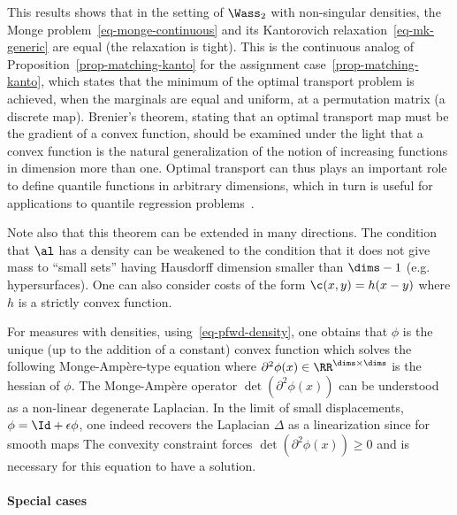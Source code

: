 This results shows that in the setting of $\Wass_2$ with non-singular densities, the Monge problem~\eqref{eq-monge-continuous} and its Kantorovich relaxation~\eqref{eq-mk-generic} are equal (the relaxation is tight). This is the continuous analog of Proposition~\ref{prop-matching-kanto} for the assignment case~\eqref{prop-matching-kanto}, which states that the minimum of the optimal transport problem is achieved, when the marginals are equal and uniform, at a permutation matrix (a discrete map).
%
Brenier's theorem, stating that an optimal transport map must be the gradient of a convex function, should be examined under the light that a convex function is the natural generalization of the notion of increasing functions in dimension more than one. Optimal transport can thus plays an important role to define quantile functions in arbitrary dimensions, which in turn is useful for applications to quantile regression problems~\cite{carlier2016vector}.

Note also that this theorem can be extended in many directions. 
% 
The condition that $\al$ has a density can be weakened to the condition that it does not give mass to ``small sets'' having Hausdorff dimension smaller than $\dims-1$ (e.g. hypersurfaces). 
%
One can also consider costs of the form $\c(x,y)=h(x-y)$ where $h$ is a strictly convex function. 

For measures with densities, using~\eqref{eq-pfwd-density}, one obtains that $\phi$ is the unique (up to the addition of a constant) convex function which solves the following Monge-Ampère-type equation
where $\partial^2\phi(x) \in \RR^{\dims \times \dims}$ is the hessian of $\phi$. The Monge-Amp\`ere operator $\det(\partial^2\phi(x))$ can be understood as a non-linear degenerate Laplacian. In the limit of small displacements, $\phi=\Id + \epsilon\phi$, one indeed recovers the Laplacian $\Delta$ as a linearization since for smooth maps
%
The convexity constraint forces $\det(\partial^2\phi(x)) \geq 0$ and is necessary for this equation to have a solution. 



\paragraph{Special cases}


